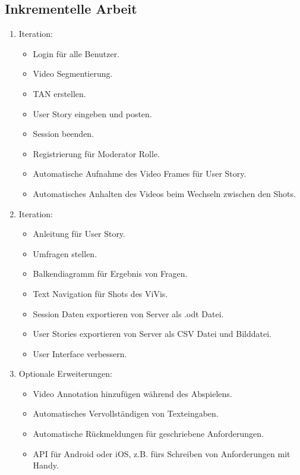 	\subsection{Inkrementelle Arbeit}
		\begin{enumerate}
			\item Iteration:
			\begin{itemize}
				\item Login für alle Benutzer.
				\item Video Segmentierung.
				\item TAN erstellen.
				\item User Story eingeben und posten.
				\item Session beenden.
				\item Registrierung für Moderator Rolle.
				\item Automatische Aufnahme des Video Frames für User Story.
				\item Automatisches Anhalten des Videos beim Wechseln zwischen den Shots.
			\end{itemize}
			\item Iteration:
			\begin{itemize}
				\item Anleitung für User Story.
				\item Umfragen stellen.
				\item Balkendiagramm für Ergebnis von Fragen.
				\item Text Navigation für Shots des ViVis.
				\item Session Daten exportieren von Server als .odt Datei.
				\item User Stories exportieren von Server als CSV Datei und Bilddatei.
				\item User Interface verbessern.
			\end{itemize}
			\item Optionale Erweiterungen:
			\begin{itemize}
				\item Video Annotation hinzufügen während des Abspielens.
				\item Automatisches Vervollständigen von Texteingaben.
				\item Automatische Rückmeldungen für geschriebene Anforderungen.
				\item API für Android oder iOS, z.B. fürs Schreiben von Anforderungen mit Handy.
			\end{itemize}
		\end{enumerate}


		